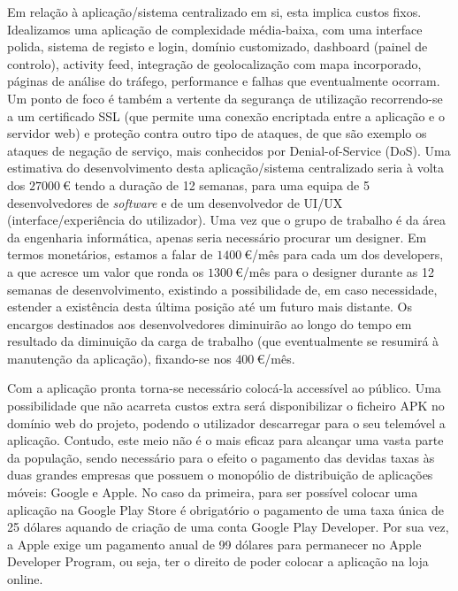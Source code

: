 \documentclass[11pt, a4paper, oneside]{book}
\begin{document}
Em relação à aplicação/sistema centralizado em si, esta implica custos fixos. Idealizamos uma aplicação de complexidade média-baixa, com uma interface polida, sistema de registo e login, domínio customizado, dashboard (painel de controlo), activity feed, integração de geolocalização com mapa incorporado, páginas de análise do tráfego, performance e falhas que eventualmente ocorram. Um ponto de foco é também a vertente da segurança de utilização recorrendo-se a um certificado SSL (que permite uma conexão encriptada entre a aplicação e o servidor web) e proteção contra outro tipo de ataques, de que são exemplo os ataques de negação de serviço, mais conhecidos por Denial-of-Service (DoS). Uma estimativa do desenvolvimento desta aplicação/sistema centralizado seria à volta dos $\SI{27000}{\euro}$ tendo a duração de 12 semanas, para uma equipa de 5 desenvolvedores de \textit{software} e de um desenvolvedor de UI/UX (interface/experiência do utilizador). Uma vez que o grupo de trabalho é da área da engenharia informática, apenas seria necessário procurar um designer. Em termos monetários, estamos a falar de $\SI{1400}{\euro}$/mês para cada um dos developers, a que acresce um valor que ronda os $\SI{1300}{\euro}$/mês para o designer durante as 12 semanas de desenvolvimento, existindo a possibilidade de, em caso necessidade, estender a existência desta última posição até um futuro mais distante. Os encargos destinados aos desenvolvedores diminuirão ao longo do tempo em resultado da diminuição da carga de trabalho (que eventualmente se resumirá à manutenção da aplicação), fixando-se nos $\SI{400}{\euro}$/mês.

Com a aplicação pronta torna-se necessário colocá-la accessível ao público. Uma possibilidade que não acarreta custos extra será disponibilizar o ficheiro APK no domínio web do projeto, podendo o utilizador descarregar para o seu telemóvel a aplicação. Contudo, este meio não é o mais eficaz para alcançar uma vasta parte da população, sendo necessário para o efeito o pagamento das devidas taxas às duas grandes empresas que possuem o monopólio de distribuição de aplicações móveis: Google e Apple. No caso da primeira, para ser possível colocar uma aplicação na Google Play Store é obrigatório o pagamento de uma taxa única de 25 dólares aquando de criação de uma conta Google Play Developer. Por sua vez, a Apple exige um pagamento anual de 99 dólares para permanecer no Apple Developer Program, ou seja, ter o direito de poder colocar a aplicação na loja online.
\end{document}
